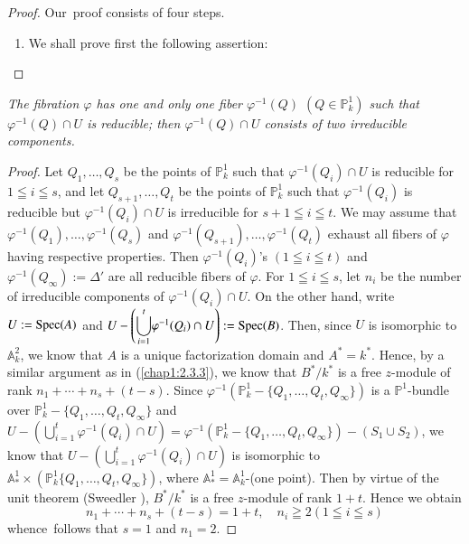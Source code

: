 \begin{proof}
Our\pageoriginale\ proof consists of four steps.
\begin{enumerate}
\renewcommand{\theenumi}{\Roman{enumi}}
\renewcommand{\labelenumi}{\rm(\theenumi)}
\item We shall prove first the following assertion:
\end{enumerate}
\end{proof}

{\em The fibration $\varphi$ has one and only one fiber
  $\varphi^{-1}(Q)$ $(Q\in \mathbb{P}^{1}_{k})$ such that
  $\varphi^{-1}(Q)\cap U$ is reducible; then $\varphi^{-1}(Q)\cap U$
  consists of two irreducible components.}

\begin{proof}
Let $Q_{1},\ldots,Q_{s}$ be the points of $\mathbb{P}^{1}_{k}$ such
that $\varphi^{-1}(Q_{i})\cap U$ is reducible for $1\leqq i\leqq s$,
and let $Q_{s+1},\ldots,Q_{t}$ be the points of $\mathbb{P}^{1}_{k}$
such that $\varphi^{-1}(Q_{i})$ is reducible but
$\varphi^{-1}(Q_{i})\cap U$ is irreducible for $s+1\leqq i\leqq t$. We
may assume that $\varphi^{-1}(Q_{1}),\ldots,\varphi^{-1}(Q_{s})$ and
$\varphi^{-1}(Q_{s+1}),\ldots,\varphi^{-1}(Q_{t})$ exhaust all fibers
of $\varphi$ having respective properties. Then
$\varphi^{-1}(Q_{i})$'s $(1\leqq i\leqq t)$ and
$\varphi^{-1}(Q_{\infty}):=\Delta'$ are all reducible fibers of
$\varphi$. For $1\leqq i\leqq s$, let $n_{i}$ be the number of
irreducible components of $\varphi^{-1}(Q_{i})\cap U$. On the other
hand, write $U:=\operatorname{Spec}(A)$ and
$U-\left({\displaystyle{\mathop{\bigcup}^{t}_{i=1}}}\varphi^{-1}(Q_{i})\cap
U\right):=\operatorname{Spec}(B)$. Then, since $U$ is isomorphic to $\mathbb{A}^{2}_{k}$,
we know that $A$ is a unique factorization domain and
$A^{\ast}=k^{\ast}$. Hence, by a similar argument as in
(\ref{chap1:2.3.3}), we know that $B^{\ast}/k^{\ast}$ is a free $z$-module
of rank $n_{1}+\cdots+n_{s}+(t-s)$. Since
$\varphi^{-1} (\mathbb{P}^{1}_{k}-\{Q_{1},\ldots,Q_{t},Q_{\infty}\})$
is a $\mathbb{P}^{1}$-bundle over
$\mathbb{P}^{1}_{k}-\{Q_{1},\ldots,Q_{t},Q_{\infty}\}$ and
$U-\left({\displaystyle{\mathop{\bigcup}^{t}_{i=1}}}\varphi^{-1}(Q_{i})\cap
U\right) =\varphi^{-1}(\mathbb{P}^{1}_{k}-\{Q_{1}, \ldots,
Q_{t},Q_{\infty}\})-(S_{1}\cup  
S_{2})$, we know that
$U-({\displaystyle{\mathop{\bigcup}^{t}_{i=1}}}\varphi^{-1}(Q_{i})\cap
U)$ is isomorphic to
$\mathbb{A}^{1}_{\ast}\times(\mathbb{P}^{1}_{k}\{Q_{1},\ldots,Q_{t},Q_{\infty}\})$,
where $\mathbb{A}^{1}_{\ast}=\mathbb{A}^{1}_{k}$-(one point). Then by
virtue of the unit theorem (\cf Sweedler \cite{54}),
$B^{\ast}/k^{\ast}$ is a free $z$-module of rank $1+t$. Hence we
obtain
$$
n_{1}+\cdots+n_{s}+(t-s)=1+t,\quad n_{i}\geqq 2(1\leqq i\leqq s)
$$
whence\pageoriginale\ follows that $s=1$ and $n_{1}=2$.


\end{proof}

